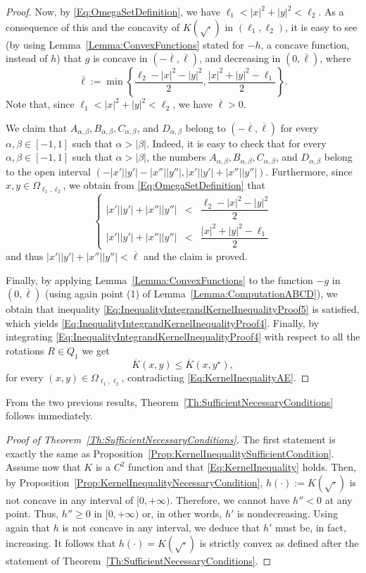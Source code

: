 \documentclass[12pt,reqno]{amsart}
\theoremstyle{definition}
\theoremstyle{remark}
\newcommand\beqc[1]{\left\{\begin{array}{#1}}
\newcommand\eeqc{\end{array} \right.}
\def\PDEsystem{rcll}
\numberwithin{equation}{section}
\begin{document}
\begin{proof}
	
	
	Now, by \eqref{Eq:OmegaSetDefinition}, we have $\ell_1 < |x|^2+|y|^2 <\ell_2$. As a consequence of this and the concavity of $K(\sqrt{\cdot})$ in $(\ell_1,\ell_2)$, it is easy to see (by using Lemma~\ref{Lemma:ConvexFunctions} stated for $-h$, a concave function, instead of $h$) that $g$ is concave in $ \left( -\overline{\ell}, \overline{\ell}\right) $, and decreasing in $(0,\overline{\ell})$, where 
	$$
	\overline{\ell} := \min{\left\{\frac{\ell_2-|x|^2-|y|^2}{2},\frac{|x|^2+|y|^2-\ell_1}{2}\right\}}.$$
	Note that, since $\ell_1 < |x|^2+|y|^2 <\ell_2$, we have $\overline{\ell}>0$.
	
	
	We claim that $A_{\alpha,\beta}, B_{\alpha,\beta}, C_{\alpha,\beta}$, and $D_{\alpha,\beta}$ belong to $(-\overline{\ell},\overline{\ell})$ for every $\alpha, \beta \in [-1,1]$ such that $\alpha>|\beta|$. Indeed, it is easy to check that for every $\alpha, \beta \in [-1,1]$ such that $\alpha>|\beta|$, the numbers $A_{\alpha,\beta}, B_{\alpha,\beta}, C_{\alpha,\beta}$, and $D_{\alpha,\beta}$ belong to the open interval $(-|x'||y'|-|x''||y''|,|x'||y'|+|x''||y''|)$. Furthermore, since $x,y \in \Omega_{\ell_1,\ell_2}$, we obtain from \eqref{Eq:OmegaSetDefinition} that
	$$
	\beqc{\PDEsystem}
	|x'||y'|+|x''||y''|&<&\dfrac{\ell_2-|x|^2-|y|^2}{2}\\
	|x'||y'|+|x''||y''|&<&\dfrac{|x|^2+|y|^2-\ell_1}{2}
	\eeqc 
	$$
	and thus $ |x'||y'|+|x''||y''|<\overline{\ell}$ and the claim is proved.
	
	Finally, by applying Lemma~\ref{Lemma:ConvexFunctions} to the function $-g$ in $(0,\overline{\ell})$ (using again  point (1) of Lemma~\ref{Lemma:ComputationABCD}), we obtain that inequality \eqref{Eq:InequalityIntegrandKernelInequalityProof5} is satisfied, which yields \eqref{Eq:InequalityIntegrandKernelInequalityProof4}. Finally, by integrating \eqref{Eq:InequalityIntegrandKernelInequalityProof4} with respect to all the rotations $R\in Q_1$ we get $$ \overline{K}(x,y) \leq \overline{K}(x, y^\star),$$ for every $(x,y)\in \Omega_{\ell_1,\ell_2}$, contradicting \eqref{Eq:KernelInequalityAE}.
\end{proof}

From the two previous results, Theorem~\ref{Th:SufficientNecessaryConditions} follows immediately.

\begin{proof}[Proof of Theorem~\ref{Th:SufficientNecessaryConditions}]
	The first statement is exactly the same as Proposition~\ref{Prop:KernelInequalitySufficientCondition}. Assume now that $K$ is a $C^2$ function and that \eqref{Eq:KernelInequality} holds. Then, by Proposition~\ref{Prop:KernelInequalityNecessaryCondition}, $h(\cdot) := K(\sqrt{\cdot})$ is not concave in any interval of $[0,+\infty)$. Therefore, we cannot have $h''<0$ at any point. Thus, $h''\geq 0$ in $[0,+\infty)$ or, in other words, $h'$ is nondecreasing. Using again that $h$ is not concave in any interval, we deduce that $h'$ must be, in fact, increasing. It follows that $h(\cdot) = K(\sqrt{\cdot})$ is strictly convex as defined after the statement of Theorem~\ref{Th:SufficientNecessaryConditions}.
\end{proof}
\end{document}
